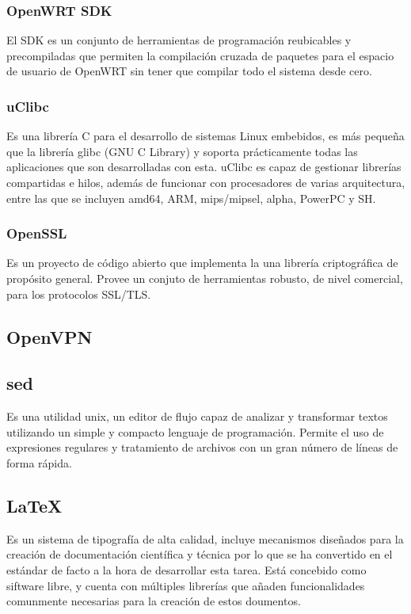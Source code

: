 \documentclass[12pt]{article}
\begin{document}
        \subsubsection{OpenWRT SDK}
            El SDK es un conjunto de herramientas de programación reubicables y precompiladas que permiten la compilación cruzada de paquetes para el espacio de usuario de OpenWRT sin tener que compilar todo el sistema desde cero.

        \subsubsection{uClibc}
            Es una librería C para el desarrollo de sistemas Linux embebidos, es más pequeña que la librería  glibc (GNU C Library) y soporta prácticamente todas las aplicaciones que son desarrolladas con esta. uClibc  es capaz de gestionar librerías compartidas e hilos, además de funcionar con procesadores de varias arquitectura, entre las que se incluyen amd64, ARM, mips/mipsel, alpha, PowerPC y SH.

        \subsubsection{OpenSSL}
            Es un proyecto de código abierto que implementa la una librería criptográfica de propósito general. Provee un conjuto de herramientas robusto, de nivel comercial, para los protocolos SSL/TLS.

    \subsection{OpenVPN}

    \subsection{sed}
        Es una utilidad unix, un editor de flujo capaz de analizar y transformar textos utilizando un simple y compacto lenguaje de programación. Permite el uso de expresiones regulares y tratamiento de archivos con un gran número de líneas de forma rápida.

    \subsection{\LaTeX}
        Es un sistema de tipografía de alta calidad, incluye mecanismos diseñados para la creación de documentación científica y técnica por lo que se ha convertido en el estándar de facto a la hora de desarrollar esta tarea. Está concebido como siftware libre, y cuenta con múltiples librerías que añaden funcionalidades comunmente necesarias para la creación de estos doumentos.
\end{document}
